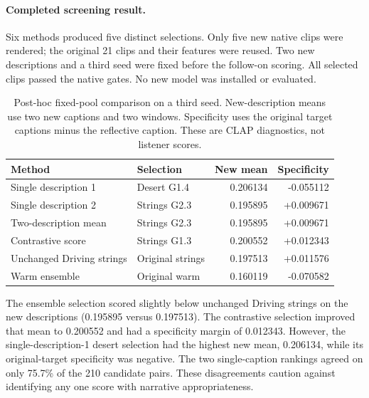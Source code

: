 \paragraph{Completed screening result.} Six methods produced five distinct selections. Only five new native clips were rendered; the original 21 clips and their features were reused. Two new descriptions and a third seed were fixed before the follow-on scoring. All selected clips passed the native gates. No new model was installed or evaluated.

\begin{table}[ht]

\centering\small

\caption{Post-hoc fixed-pool comparison on a third seed. New-description means use two new captions and two windows. Specificity uses the original target captions minus the reflective caption. These are CLAP diagnostics, not listener scores.}

\begin{tabular}{p{3.8cm}lrr}

\toprule

Method & Selection & New mean & Specificity\\

\midrule

Single description 1 & Desert G1.4 & 0.206134 & -0.055112 \\

Single description 2 & Strings G2.3 & 0.195895 & +0.009671 \\

Two-description mean & Strings G2.3 & 0.195895 & +0.009671 \\

Contrastive score & Strings G1.3 & 0.200552 & +0.012343 \\

Unchanged Driving strings & Original strings & 0.197513 & +0.011576 \\

Warm ensemble & Original warm & 0.160119 & -0.070582 \\

\bottomrule

\end{tabular}

\label{tab:comparison}

\end{table}

The ensemble selection scored slightly below unchanged Driving strings on the new descriptions (0.195895 versus 0.197513). The contrastive selection improved that mean to 0.200552 and had a specificity margin of 0.012343. However, the single-description-1 desert selection had the highest new mean, 0.206134, while its original-target specificity was negative. The two single-caption rankings agreed on only 75.7\% of the 210 candidate pairs. These disagreements caution against identifying any one score with narrative appropriateness.

